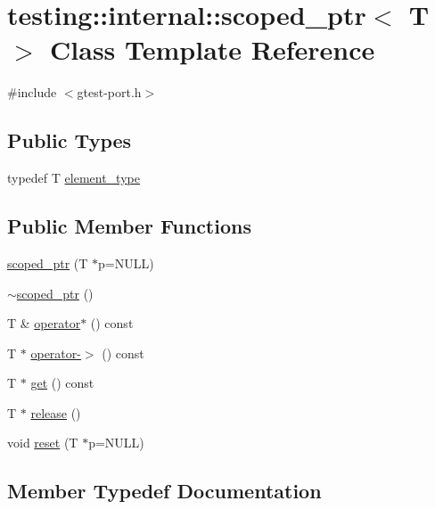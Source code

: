 \hypertarget{classtesting_1_1internal_1_1scoped__ptr}{}\section{testing\+:\+:internal\+:\+:scoped\+\_\+ptr$<$ T $>$ Class Template Reference}
\label{classtesting_1_1internal_1_1scoped__ptr}


{\ttfamily \#include $<$gtest-\/port.\+h$>$}

\subsection*{Public Types}
\begin{DoxyCompactItemize}
\item 
typedef T \hyperlink{classtesting_1_1internal_1_1scoped__ptr_ae755ffeebada8e20b68c1d1ffa91cf13}{element\+\_\+type}
\end{DoxyCompactItemize}
\subsection*{Public Member Functions}
\begin{DoxyCompactItemize}
\item 
\hyperlink{classtesting_1_1internal_1_1scoped__ptr_adb972432999a0c63720df148964ac2a5}{scoped\+\_\+ptr} (T $\ast$p=N\+U\+L\+L)
\item 
\hyperlink{classtesting_1_1internal_1_1scoped__ptr_ab721de9bf4369f002fb563e82352ee36}{$\sim$scoped\+\_\+ptr} ()
\item 
T \& \hyperlink{classtesting_1_1internal_1_1scoped__ptr_ab197837f87062de69d9d6e04539bbabe}{operator$\ast$} () const 
\item 
T $\ast$ \hyperlink{classtesting_1_1internal_1_1scoped__ptr_adc38310fbbe400faf9279e36000a17c4}{operator-\/$>$} () const 
\item 
T $\ast$ \hyperlink{classtesting_1_1internal_1_1scoped__ptr_adc8f8fcb63ce69f80f011456e6d2f08d}{get} () const 
\item 
T $\ast$ \hyperlink{classtesting_1_1internal_1_1scoped__ptr_a7a4f3e568d81a5d8bcb5f8d6bf5130b1}{release} ()
\item 
void \hyperlink{classtesting_1_1internal_1_1scoped__ptr_acac03266a43359801aff0de5c990bec0}{reset} (T $\ast$p=N\+U\+L\+L)
\end{DoxyCompactItemize}


\subsection{Member Typedef Documentation}
\hypertarget{classtesting_1_1internal_1_1scoped__ptr_ae755ffeebada8e20b68c1d1ffa91cf13}{}
